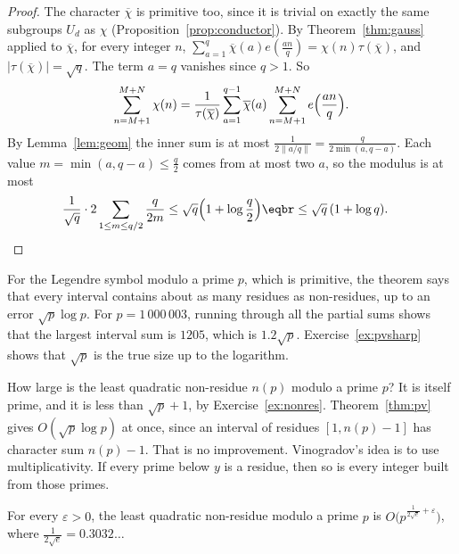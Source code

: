\begin{proof}
The character $\overline\chi$ is primitive too, since it is trivial on exactly the same subgroups $U_d$ as $\chi$ (Proposition~\ref{prop:conductor}). By Theorem~\ref{thm:gauss} applied to $\overline\chi$, for every integer $n$,
$\sum_{a=1}^q\overline\chi(a)e(\frac{an}q)=\chi(n)\tau(\overline\chi)$, and $|\tau(\overline\chi)|=\sqrt q$. The term $a=q$ vanishes since $q>1$. So
\[
\sum_{n=M+1}^{M+N}\chi(n)=\frac1{\tau(\overline\chi)}\sum_{a=1}^{q-1}\overline\chi(a)\sum_{n=M+1}^{M+N}e\Bigl(\frac{an}q\Bigr).
\]
By Lemma~\ref{lem:geom} the inner sum is at most $\frac1{2\|a/q\|}=\frac q{2\min(a,q-a)}$. Each value $m=\min(a,q-a)\le\frac q2$ comes from at most two $a$, so the modulus is at most
\[
\begin{aligned}\frac1{\sqrt q}\cdot2\sum_{1\le m\le q/2}\frac q{2m}&\le\sqrt q\Bigl(1+\log\frac q2\Bigr)\eqbr\le\sqrt q\,(1+\log q).\end{aligned}
\]
\end{proof}

For the Legendre symbol modulo a prime $p$, which is primitive, the theorem says that every interval contains about as many residues as non-residues, up to an error $\sqrt p\log p$. For $p=1\,000\,003$, running through all the partial sums shows that the largest interval sum is $1205$, which is $1.2\sqrt p$. Exercise~\ref{ex:pvsharp} shows that $\sqrt p$ is the true size up to the logarithm.

How large is the least quadratic non-residue $n(p)$ modulo a prime $p$? It is itself prime, and it is less than $\sqrt p+1$, by Exercise~\ref{ex:nonres}. Theorem~\ref{thm:pv} gives $O(\sqrt p\log p)$ at once, since an interval of residues $[1,n(p)-1]$ has character sum $n(p)-1$. That is no improvement. Vinogradov's idea is to use multiplicativity. If every prime below $y$ is a residue, then so is every integer built from those primes.

\begin{theorem}[Vinogradov]\label{thm:vinogradov}
For every $\varepsilon>0$, the least quadratic non-residue modulo a prime $p$ is $O\bigl(p^{\frac1{2\sqrt e}+\varepsilon}\bigr)$, where $\frac1{2\sqrt e}=0.3032\ldots$
\end{theorem}

